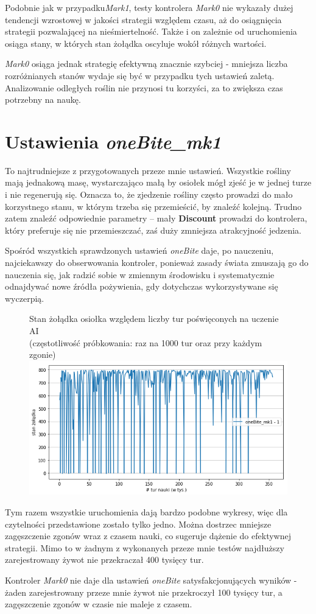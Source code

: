 Podobnie jak w przypadku\textit{Mark1}, testy kontrolera \textit{Mark0} nie wykazały dużej tendencji wzrostowej w jakości strategii względem czasu, aż do osiągnięcia strategii pozwalającej na nieśmiertelność. Także i on zależnie od uruchomienia osiąga stany, w których stan żołądka oscyluje wokół różnych wartości.

\textit{Mark0} osiąga jednak strategię efektywną znacznie szybciej - mniejsza liczba rozróżnianych stanów wydaje się być w przypadku tych ustawień zaletą. Analizowanie odległych roślin nie przynosi tu korzyści, za to zwiększa czas potrzebny na naukę.

\section{Ustawienia \textit{oneBite\_mk1}}
To najtrudniejsze z przygotowanych przeze mnie ustawień. Wszystkie rośliny mają jednakową masę, wystarczająco małą by osiołek mógł zjeść je w jednej turze i nie regenerują się. Oznacza to, że zjedzenie rośliny często prowadzi do mało korzystnego stanu, w którym trzeba się przemieścić, by znaleźć kolejną. Trudno zatem znaleźć odpowiednie parametry -- mały \textbf{Discount} prowadzi do kontrolera, który preferuje się nie przemieszczać, zaś duży zmniejsza atrakcyjność jedzenia.

Spośród wszystkich sprawdzonych ustawień \textit{oneBite} daje, po nauczeniu, najciekawszy do obserwowania kontroler, ponieważ zasady świata zmuszają go do nauczenia się, jak radzić sobie w zmiennym środowisku i systematycznie odnajdywać nowe źródła pożywienia, gdy dotychczas wykorzystywane się wyczerpią.
\begin{figure}[H]
    \centering
    Stan żołądka osiołka względem liczby tur poświęconych na uczenie AI
    \\(częstotliwość próbkowania: raz na 1000 tur oraz przy każdym zgonie)
    \includegraphics[scale=0.6]{Chapters/oneBite_mk1}
\end{figure}
Tym razem wszystkie uruchomienia dają bardzo podobne wykresy, więc dla czytelności przedstawione zostało tylko jedno. Można dostrzec mniejsze zagęszczenie zgonów wraz z czasem nauki, co sugeruje dążenie do efektywnej strategii. Mimo to w żadnym z wykonanych przeze mnie testów najdłuższy zarejestrowany żywot nie przekraczał 400 tysięcy tur.

Kontroler \textit{Mark0} nie daje dla ustawień \textit{oneBite} satysfakcjonujących wyników - żaden zarejestrowany przeze mnie żywot nie przekroczył 100 tysięcy tur, a zagęszczenie zgonów w czasie nie maleje z czasem.
